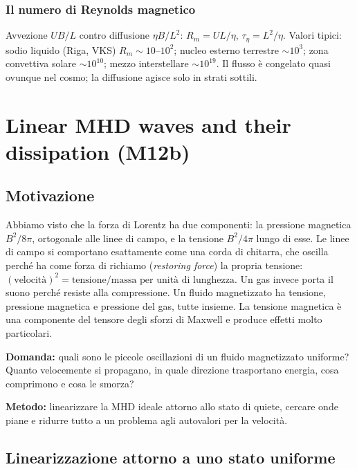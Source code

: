 \subsubsection{Il numero di Reynolds magnetico}
Avvezione $UB/L$ contro diffusione $\eta B/L^2$: $R_m=UL/\eta$, $\tau_\eta=L^2/\eta$. Valori tipici: sodio liquido (Riga, VKS) $R_m\sim10$--$10^2$; nucleo esterno terrestre $\sim10^3$; zona convettiva solare $\sim10^{10}$; mezzo interstellare $\sim10^{19}$. Il flusso è congelato quasi ovunque nel cosmo; la diffusione agisce solo in strati sottili.

\section{Linear MHD waves and their dissipation (M12b)}

\subsection{Motivazione}

Abbiamo visto che la forza di Lorentz ha due componenti: la pressione magnetica $B^2/8\pi$, ortogonale alle linee di campo, e la tensione $B^2/4\pi$ lungo di esse. Le linee di campo si comportano esattamente come una corda di chitarra, che oscilla perché ha come forza di richiamo (\emph{restoring force}) la propria tensione: $(\text{velocità})^2=\text{tensione}/\text{massa per unità di lunghezza}$. Un gas invece porta il suono perché resiste alla compressione. Un fluido magnetizzato ha tensione, pressione magnetica e pressione del gas, tutte insieme. La tensione magnetica è una componente del tensore degli sforzi di Maxwell e produce effetti molto particolari.

\textbf{Domanda:} quali sono le piccole oscillazioni di un fluido magnetizzato uniforme? Quanto velocemente si propagano, in quale direzione trasportano energia, cosa comprimono e cosa le smorza?

\textbf{Metodo:} linearizzare la MHD ideale attorno allo stato di quiete, cercare onde piane e ridurre tutto a un problema agli autovalori per la velocità.

\subsection{Linearizzazione attorno a uno stato uniforme}

